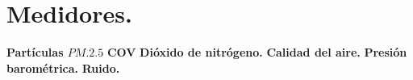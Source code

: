 \section{Medidores.}

    {\large \textbf{Partículas $PM.2.5$}}
    \vskip 0.2in
    {\large \textbf{COV}}
    \vskip 0.2in
    {\large \textbf{Dióxido de nitrógeno.}}
    \vskip 0.2in
    {\large \textbf{Calidad del aire.}}
    \vskip 0.2in
    {\large \textbf{Presión barométrica.}}
    \vskip 0.2in
    {\large \textbf{Ruido.}}
    \vskip 0.2in
